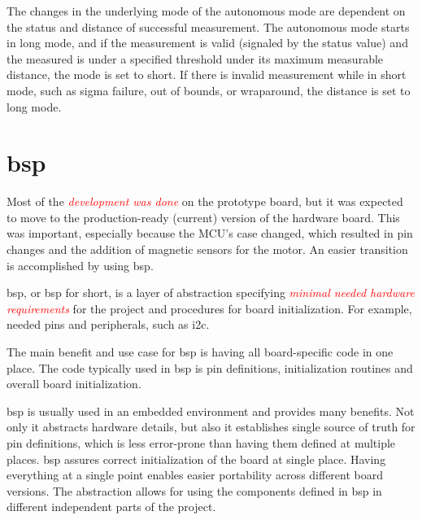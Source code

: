 \documentclass[
  digital,     %
  oneside,     %
  nosansbold,  %
  nocolorbold, %
  nolof,         %
  nolot,         %
]{fithesis4}
\newcommand{\TODO}[1]{\textcolor{red}{\textit{#1}}}
\newcommand{\TODOLIST}[1]{}
\begin{document}
{{{The changes in the underlying mode of the autonomous mode are dependent on the status and distance of successful measurement. The autonomous mode starts in long mode, and if the measurement is valid (signaled by the status value) and the measured is under a specified threshold under its maximum measurable distance, the mode is set to short. If there is invalid measurement while in short mode, such as sigma failure, out of bounds, or wraparound, the distance is set to long mode.


\chapter[ Board Support Package ]{\acrlong{bsp}} \label{ch:bsp}
\TODOLIST{
\begin{itemize}
    \item \acrshort{bsp} = providing i2c functions to \acrshort{lidar} library + easier portability
    \item \acrshort{bsp} = global namespace \lstinline{Gpio::Pin} initialization is **UB**
\end{itemize}
}

Most of the \TODO{development was done} on the prototype board, but it was expected to move to the production-ready (current) version of the hardware board. This was important, especially because the MCU's case changed, which resulted in pin changes and the addition of magnetic sensors for the motor. An easier transition is accomplished by using \acrshort{bsp}.

\acrlong{bsp}, or \acrshort{bsp} for short, is a layer of abstraction specifying  \TODO{minimal needed hardware requirements} for the project and procedures for board initialization. For example, needed pins and peripherals, such as \acrshort{i2c}. 

The main benefit and use case for \acrshort{bsp} is having all board-specific code in one place. The code typically used in \acrshort{bsp} is pin definitions, initialization routines and overall board initialization.

\acrshort{bsp} is usually used in an embedded environment and provides many benefits. Not only it abstracts hardware details, but also it establishes single source of truth for pin definitions, which is less error-prone than having them defined at multiple places. \acrshort{bsp} assures correct initialization of the board at single place. Having everything at a single point enables easier portability across different board versions. The abstraction allows for using the components defined in \acrshort{bsp} in different independent parts of the project. 

}}}
\end{document}
